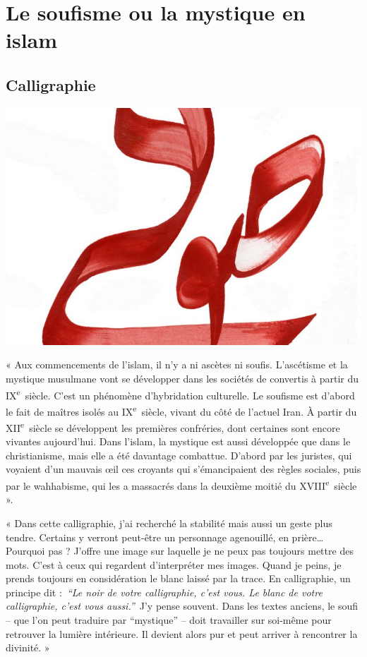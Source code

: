 
\chapter{
Le soufisme ou la mystique en islam}


\section{Calligraphie}


\includegraphics[width=\textwidth]{Images/image013.jpg}


« Aux commencements de l'islam, il n'y a ni ascètes ni soufis.
L'ascétisme et la mystique musulmane vont se développer dans les
sociétés de convertis à partir du IX\textsuperscript{e}~siècle. C'est un
phénomène d'hybridation culturelle. Le soufisme est d'abord le fait de
maîtres isolés au IX\textsuperscript{e}~siècle, vivant du côté de
l'actuel Iran. À partir du XII\textsuperscript{e}~siècle se développent
les premières confréries, dont certaines sont encore vivantes
aujourd'hui. Dans l'islam, la mystique est aussi développée que dans le
christianisme, mais elle a été davantage combattue. D'abord par les
juristes, qui voyaient d'un mauvais œil ces croyants qui s'émancipaient
des règles sociales, puis par le wahhabisme, qui les a massacrés dans la
deuxième­ moitié du XVIII\textsuperscript{e}~siècle ».


« Dans cette calligraphie, j'ai recherché la stabilité mais aussi un
geste plus tendre. Certains y verront peut-être un personnage
agenouillé, en prière\ldots{} Pourquoi pas ? J'offre une image sur
laquelle je ne peux pas toujours mettre des mots. C'est à ceux qui
regardent d'interpréter mes images. Quand je peins, je prends toujours
en considération le blanc laissé par la trace. En calligraphie, un
principe dit :\emph{~``Le noir de votre calligraphie, c'est vous. Le
blanc de votre calligraphie, c'est vous aussi.''}~J'y pense souvent.
Dans les textes anciens, le soufi -- que l'on peut traduire par
``mystique'' -- doit travailler sur soi-même pour retrouver la lumière
intérieure. Il devient alors pur et peut arriver à rencontrer la
divinité. »


